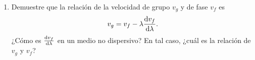 \documentclass[11pt,spanish,a4paper]{article}
\begin{document}
\begin{enumerate}
\item Demuestre que la relación de la velocidad de grupo $v_g$ y de fase $v_f$ es
$$
v_g = v_f - \lambda \dv{v_f}{\lambda}.
$$
¿Cómo es $\dv{v_f}{\lambda}$ en un medio no dispersivo?
En tal caso, ¿cuál es la relación de $v_g$ y $v_f$?





\end{enumerate}
\end{document}
